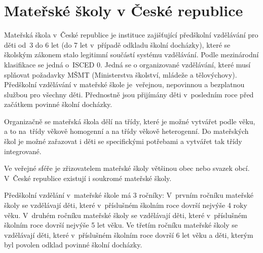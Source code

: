 	\section{Mateřské školy v České republice}
		Mateřská škola v České republice je instituce zajišťující předškolní vzdělávání pro děti od 3 do 6 let (do 7 let v případě odkladu školní docházky), které se školským zákonem stalo legitimní součástí systému vzdělávání. Podle mezinárodní klasifikace se jedná o ISCED 0. Jedná se o organizované vzdělávání, které musí splňovat požadavky MŠMT (Ministerstva školství, mládeže a tělovýchovy). Předškolní vzdělávání v mateřské škole je veřejnou, nepovinnou a bezplatnou službou pro všechny děti. Přednostně jsou přijímány děti v posledním roce před začátkem povinné školní docházky. 

		Organizačně se mateřská škola dělí na třídy, které je možné vytvářet podle věku, a to na třídy věkově homogenní a na třídy věkově heterogenní. Do mateřských škol je možné zařazovat i děti se specifickými potřebami a vytvářet tak třídy integrované. 

		Ve veřejné sféře je zřizovatelem mateřské školy většinou obec nebo svazek obcí. V České republice existují i soukromé mateřské školy.

		Předškolní vzdělání v mateřské škole má 3 ročníky:
		V prvním ročníku mateřské školy se vzdělávají děti, které v příslušném školním roce dovrší nejvýše 4 roky věku.
		V druhém ročníku mateřské školy se vzdělávají děti, které v příslušném školním roce dovrší nejvýše 5 let věku.
		Ve třetím ročníku mateřské školy se vzdělávají děti, které v příslušném školním roce dovrší 6 let věku a děti, kterým byl povolen odklad povinné školní docházky. 

